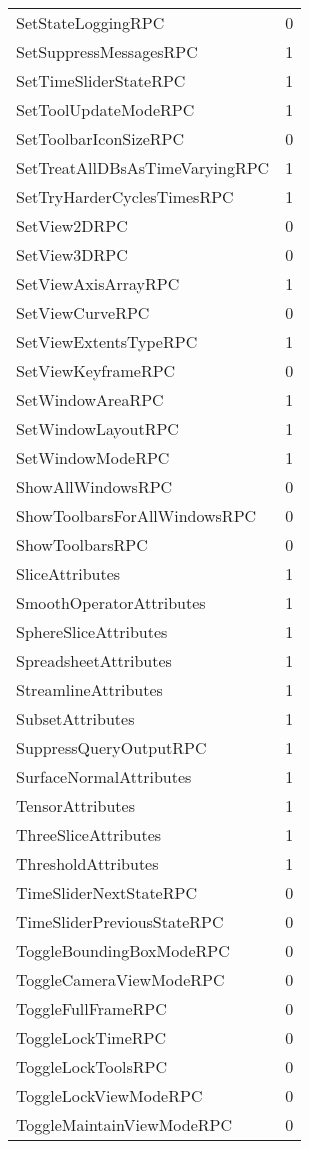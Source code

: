 \documentclass[10pt,a4paper]{report}
\begin{document}
\begin{longtable}{ll}
SetStateLoggingRPC & 0 \\
SetSuppressMessagesRPC & 1 \\
SetTimeSliderStateRPC & 1 \\
SetToolUpdateModeRPC & 1 \\
SetToolbarIconSizeRPC & 0 \\
SetTreatAllDBsAsTimeVaryingRPC & 1 \\
SetTryHarderCyclesTimesRPC & 1 \\
SetView2DRPC & 0 \\
SetView3DRPC & 0 \\
SetViewAxisArrayRPC & 1 \\
SetViewCurveRPC & 0 \\
SetViewExtentsTypeRPC & 1 \\
SetViewKeyframeRPC & 0 \\
SetWindowAreaRPC & 1 \\
SetWindowLayoutRPC & 1 \\
SetWindowModeRPC & 1 \\
ShowAllWindowsRPC & 0 \\
ShowToolbarsForAllWindowsRPC & 0 \\
ShowToolbarsRPC & 0 \\
SliceAttributes & 1 \\
SmoothOperatorAttributes & 1 \\
SphereSliceAttributes & 1 \\
SpreadsheetAttributes & 1 \\
StreamlineAttributes & 1 \\
SubsetAttributes & 1 \\
SuppressQueryOutputRPC & 1 \\
SurfaceNormalAttributes & 1 \\
TensorAttributes & 1 \\
ThreeSliceAttributes & 1 \\
ThresholdAttributes & 1 \\
TimeSliderNextStateRPC & 0 \\
TimeSliderPreviousStateRPC & 0 \\
ToggleBoundingBoxModeRPC & 0 \\
ToggleCameraViewModeRPC & 0 \\
ToggleFullFrameRPC & 0 \\
ToggleLockTimeRPC & 0 \\
ToggleLockToolsRPC & 0 \\
ToggleLockViewModeRPC & 0 \\
ToggleMaintainViewModeRPC & 0 \\

\end{longtable}
\end{document}
